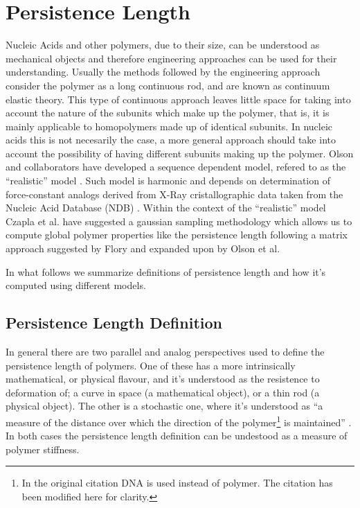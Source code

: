 \chapter{Persistence Length}
\label{appendix4a}

Nucleic Acids and other polymers, due to their size, can be understood
as  mechanical  objects  \cite{marko2003,  nelson2004}  and  therefore
engineering approaches  can be used for  their understanding.  Usually
the methods followed by  the engineering approach consider the polymer
as  a  long  continuous  rod,  and  are  known  as  continuum  elastic
theory.  This type  of  continuous approach  leaves  little space  for
taking  into account  the nature  of the  subunits which  make  up the
polymer, that is,  it is mainly applicable to  homopolymers made up of
identical subunits. In nucleic acids  this is not necesarily the case,
a more  general approach should  take into account the  possibility of
having  different   subunits  making   up  the  polymer.    Olson  and
collaborators have developed a sequence dependent model, refered to as
the ``realistic'' model \cite{olson1993}.   Such model is harmonic and
depends on determination of  force-constant analogs derived from X-Ray
cristallographic  data  taken from  the  Nucleic  Acid Database  (NDB)
\cite{go1976,  olson1998}.  Within  the context  of  the ``realistic''
model  Czapla  et al.   \cite{czapla2006}  have  suggested a  gaussian
sampling  methodology  which  allows  us  to  compute  global  polymer
properties  like  the  persistence  length  following  a  matrix
approach  suggested by  Flory  \cite{flory1969} and  expanded upon  by
Olson et al. \cite{maroun1988a, marky1994a}

In what follows we summarize definitions of persistence length and how
it's computed using different models.

\section{Persistence Length Definition}
In  general there  are two  parallel and  analog perspectives  used to
define  the persistence  length  of  polymers. One of these has a  more
intrinsically mathematical,  or physical flavour,  and it's understood
as the resistence to deformation  of; a curve in space (a mathematical
object), or a thin rod (a physical object).  The other is a stochastic
one, where it's  understood as ``a measure of  the distance over which
the direction of the  polymer\footnote{In the original citation DNA is
  used instead of polymer. The citation has been modified here for
  clarity.} is maintained'' \cite{olson1995}.  In both cases the
persistence length definition can be undestood as a measure of polymer
stiffness.

